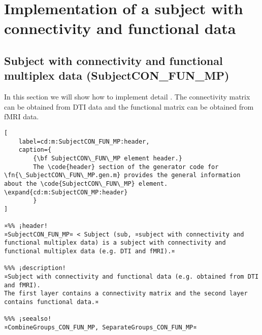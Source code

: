 \documentclass{tufte-handout}
\begin{document}
\clearpage

\section{Implementation of a subject with connectivity and functional data}

\subsection{Subject with connectivity and functional multiplex data (SubjectCON\_FUN\_MP)}

In this section we will show how to implement detail . The connectivity matrix can be obtained from DTI data and the functional matrix can be obtained from fMRI data.

\begin{lstlisting}[
	label=cd:m:SubjectCON_FUN_MP:header,
	caption={
		{\bf SubjectCON\_FUN\_MP element header.}
		The \code{header} section of the generator code for \fn{\_SubjectCON\_FUN\_MP.gen.m} provides the general information about the \code{SubjectCON\_FUN\_MP} element. \expand{cd:m:SubjectCON_MP:header}
		}
]

¤%% ¡header!
¤SubjectCON_FUN_MP¤ < Subject (sub, ¤subject with connectivity and functional multiplex data) is a subject with connectivity and functional multiplex data (e.g. DTI and fMRI).¤

%%% ¡description!
¤Subject with connectivity and functional data (e.g. obtained from DTI and fMRI).
The first layer contains a connectivity matrix and the second layer contains functional data.¤

%%% ¡seealso!
¤CombineGroups_CON_FUN_MP, SeparateGroups_CON_FUN_MP¤

\end{lstlisting}
\end{document}
